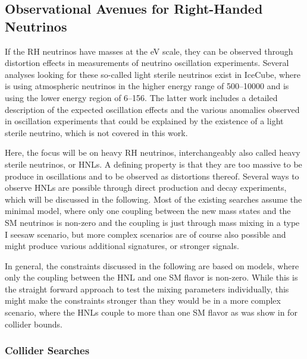 \subsection{Observational Avenues for Right-Handed Neutrinos}

If the RH neutrinos have masses at the \si{\electronvolt} scale, they can be observed through distortion effects in measurements of neutrino oscillation experiments. Several analyses looking for these so-called light sterile neutrinos exist in IceCube, where  is using atmospheric neutrinos in the higher energy range of \SIrange{500}{10000}{\gev} and  is using the lower energy region of \SIrange{6}{156}{\gev}. The latter work includes a detailed description of the expected oscillation effects and the various anomalies observed in oscillation experiments that could be explained by the existence of a light sterile neutrino, which is not covered in this work.

Here, the focus will be on heavy RH neutrinos, interchangeably also called heavy sterile neutrinos, or HNLs. A defining property is that they are too massive to be produce in oscillations and to be observed as distortions thereof. Several ways to observe HNLs are possible through direct production and decay experiments, which will be discussed in the following. Most of the existing searches assume the minimal model, where only one coupling between the new mass states and the SM neutrinos is non-zero and the coupling is just through mass mixing in a type I seesaw scenario, but more complex scenarios are of course also possible and might produce various additional signatures, or stronger signals.

In general, the constraints discussed in the following are based on models, where only the coupling between the HNL and one SM flavor is non-zero. While this is the straight forward approach to test the mixing parameters individually, this might make the constraints stronger than they would be in a more complex scenario, where the HNLs couple to more than one SM flavor as was show in  for collider bounds.


\subsubsection{Collider Searches}

